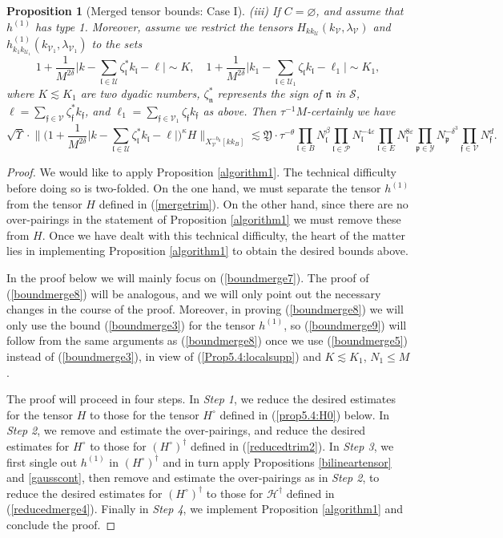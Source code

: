 \documentclass[11 pt,reqno]{amsart}
\newtheorem{prop}[thm]{Proposition}
\theoremstyle{definition}
\theoremstyle{remark}
\numberwithin{equation}{section}
\newcommand{\Sc}{\mathcal{S}}
\newcommand{\Pc}{\mathcal{P}}
\newcommand{\Uc}{\mathcal{U}}
\newcommand{\Vc}{\mathcal{V}}
\newcommand{\Yc}{\mathcal{Y}}
\newcommand{\pf}{\mathfrak{p}}
\newcommand{\Hc}{\mathcal{H}}
\newcommand{\ff}{\mathfrak{f}}
\newcommand{\nf}{\mathfrak{n}}
\newcommand{\lf}{\mathfrak{l}}
\newcommand{\Yf}{\mathfrak{Y}}
\begin{document}
{\begin{prop}[Merged tensor bounds: Case I]
 (iii) If $C=\varnothing$, and assume that $h^{(1)}$ has type 1. Moreover, assume we restrict the tensors $H_{kk_\Uc}(k_\Vc,\lambda_\Vc)$ and $h_{k_1k_{\Uc_1}}^{(1)}(k_{\Vc_1},\lambda_{\Vc_1})$ to the sets
 \begin{equation}\label{Prop5.4:localsupp}
 1+\frac{1}{M^{2\delta}}\bigg|k-\sum_{\lf\in\Uc}\zeta_\lf^* k_\lf-\ell\bigg|\sim K,\quad 1+\frac{1}{M^{2\delta}}\bigg|k_1-\sum_{\lf\in\Uc_1}\zeta_\lf k_\lf-\ell_1\bigg|\sim K_1,\end{equation} where $K\lesssim K_1$ are two dyadic numbers, $\zeta_\nf^*$ represents the sign of $\nf$ in $\Sc$, $\ell=\sum_{\ff\in\Vc}\zeta_\ff^* k_\ff$, and $\ell_1=\sum_{\ff\in\Vc_1}\zeta_\ff k_\ff$ as above. Then $\tau^{-1}M$-certainly we have  \begin{equation} \label{boundmerge9}\sqrt{\Upsilon}\cdot\bigg\|\bigg(1+\frac{1}{M^{2\delta}}\big|k-\sum_{\lf\in\Uc}\zeta_\lf^* k_\lf-\ell\big|\bigg)^\kappa H\bigg\|_{X_\Vc^{-b_0}[kk_{B}]}\lesssim\Yf\cdot \tau^{-\theta}\prod_{\lf\in B}N_\lf^\beta\prod_{\lf\in\Pc}N_\lf^{-4\varepsilon}\prod_{\lf\in E}N_\lf^{8\varepsilon}\prod_{\pf\in\Yc}N_\pf^{-\delta^3} \prod_{\ff \in \Vc} N_\ff^d.
 \end{equation}
\end{prop}
\begin{proof}
We would like to apply Proposition \ref{algorithm1}.
The technical difficulty before doing so is two-folded. On the one hand, we must separate the tensor $h^{(1)}$ from the tensor $H$ defined in (\ref{mergetrim}).
On the other hand, since there are no over-pairings in the statement of Proposition \ref{algorithm1}
we must remove these from $H$. Once we have dealt with this technical difficulty, the heart of the matter lies in implementing Proposition \ref{algorithm1} to obtain the desired bounds above.

 In the proof below we will mainly focus on (\ref{boundmerge7}). The proof of (\ref{boundmerge8}) will be analogous, and we will only point out the necessary changes in the course of the proof.  
 Moreover, in proving (\ref{boundmerge8}) we will only use the bound (\ref{boundmerge3}) for the tensor $h^{(1)}$, so (\ref{boundmerge9}) will follow from the same arguments as (\ref{boundmerge8}) once we use (\ref{boundmerge5}) instead of (\ref{boundmerge3}), in view of (\ref{Prop5.4:localsupp}) and $K\lesssim K_1$, $N_1\leq M$.
 
The proof will proceed in four steps. In \emph{Step 1}, we reduce the desired estimates for the tensor $H$ to those for the tensor $H^\circ$ defined in (\ref{prop5.4:H0}) below. In \emph{Step 2}, we remove and estimate the over-pairings, and reduce the desired estimates for $H^\circ$ to those for $(H^\circ)^\dagger$ defined in (\ref{reducedtrim2}). In \emph{Step 3}, we first single out $h^{(1)}$ in $(H^\circ)^\dagger$ and in turn apply Propositions \ref{bilineartensor} and \ref{gausscont}, then remove and estimate the over-pairings as in \emph{Step 2}, to reduce the desired estimates for $(H^\circ)^\dagger$ to those for $\Hc^\dagger$ defined in (\ref{reducedmerge4}). Finally in \emph{Step 4}, we implement Proposition \ref{algorithm1} and conclude the proof.


\end{proof}}
\end{document}
